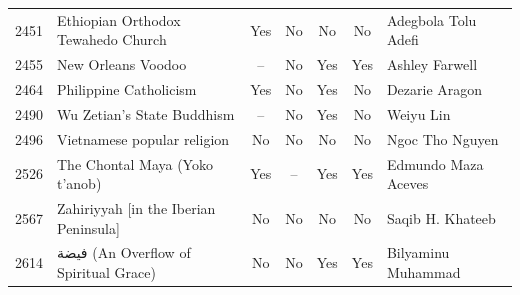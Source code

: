 {\begin{longtable}{rp{3.5cm}ccccp{3cm}}
2451 & {\raggedright Ethiopian Orthodox Tewahedo Church} & Yes & No & No & No & {\raggedright Adegbola Tolu Adefi} \\
2455 & {\raggedright New Orleans Voodoo} & -- & No & Yes & Yes & {\raggedright Ashley Farwell} \\
2464 & {\raggedright Philippine Catholicism} & Yes & No & Yes & No & {\raggedright Dezarie Aragon} \\
2490 & {\raggedright Wu Zetian's State Buddhism} & -- & No & Yes & No & {\raggedright Weiyu Lin} \\
2496 & {\raggedright Vietnamese popular religion} & No & No & No & No & {\raggedright Ngoc Tho Nguyen} \\
2526 & {\raggedright The Chontal Maya (Yoko t’anob)} & Yes & -- & Yes & Yes & {\raggedright Edmundo Maza Aceves} \\
2567 & {\raggedright Zahiriyyah [in the Iberian Peninsula]} & No & No & No & No & {\raggedright Saqib H. Khateeb} \\
2614 & {\raggedright {\arabicfont فيضة} (An Overflow of Spiritual Grace)} & No & No & Yes & Yes & {\raggedright Bilyaminu Muhammad} \\
\end{longtable}
}